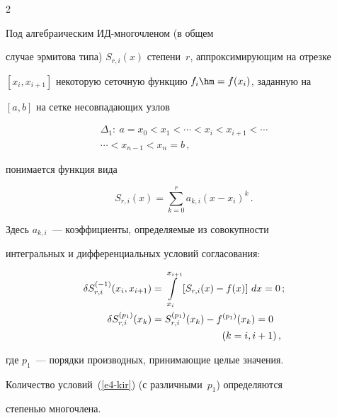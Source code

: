 \begin{multicols}{2}
  


  Под  алгебраическим ИД-многочленом (в общем 


случае эрмитова типа) $S_{r,i}(x)$ степени~$r$, аппроксимирующим на отрезке 


$[x_i,x_{i+1}]$ некоторую сеточную функцию $f_i\hm=f(x_i)$, заданную на 


$[a,b]$ на сетке несовпадающих узлов


  \begin{multline}


  \Delta_1:\ a=x_0<x_1<\cdots < x_i<x_{i+1}<\cdots \\


{}  \cdots< x_{n-1}<x_n=b\,,


  \label{e1-kir}


  \end{multline}


понимается функция вида 


\begin{equation}


S_{r,i}(x)=\sum\limits_{k=0}^r a_{k,i}(x-x_i)^k\,.


\label{e2-kir}


\end{equation}


  Здесь $a_{k,i}$~--- коэффициенты, определяемые из совокупности 


интегральных и дифференциальных условий согласования:


  \begin{align}


  \delta S_{r,i}^{(-1)}(x_i,x_{i+1}) &= \int\limits_{x_i}^{x_{i+1}} \left[ 


S_{r,i}(x) - f(x)\right]\,dx =0\,;\label{e3-kir}\\


  \delta S_{r,i}^{(p_1)}(x_k) &= S_{r,i}^{(p_1)}(x_k) -f^{(p_1)}(x_k) =0\notag\\ 


&\hspace*{25mm}(k=i,i+1)\,,\label{e4-kir}


  \end{align}


где $p_1$~--- порядки производных, принимающие целые значения.





  Количество условий~(\ref{e4-kir}) (с различными~$p_1$) определяются 


степенью многочлена.



\end{multicols}
